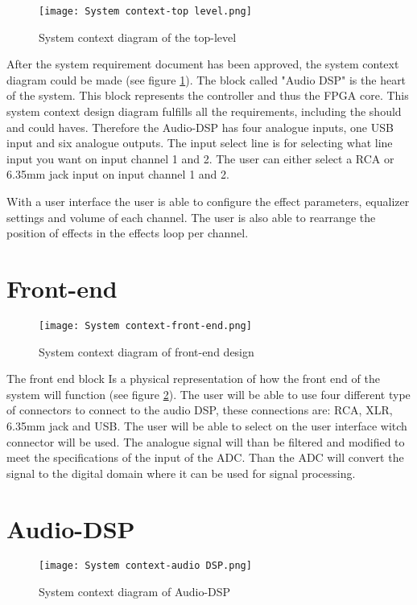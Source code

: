 \begin{figure}[ht]
    \texttt{[image: System context-top level.png]}
    \caption{System context diagram of the top-level}
    \label{fig:sys-context-top}
\end{figure}

After the system requirement document has been approved, the system context diagram could be made (see figure \ref{fig:sys-context-top}). The block called "Audio DSP" is the heart of the system. This block represents the controller and thus the FPGA core. This system context design diagram fulfills all the requirements, including the should and could haves. Therefore the Audio-DSP has four analogue inputs, one USB input and six analogue outputs. The input select line is for selecting what line input you want on input channel 1 and 2. The user can either select a RCA or 6.35mm jack input on input channel 1 and 2.

With a user interface the user is able to configure the effect parameters, equalizer settings and volume of each channel. The user is also able to rearrange the position of effects in the effects loop per channel.

\section{Front-end}
\begin{figure}[ht]
    \texttt{[image: System context-front-end.png]}
    \caption{System context diagram of front-end design}
    \label{fig:system-context-front-end}
\end{figure}

The front end block Is a physical representation of how the front end of the system will function (see figure \ref{fig:system-context-front-end}). The user will be able to use four different type of connectors to connect to the audio DSP, these connections are: RCA, XLR, 6.35mm jack and USB. The user will be able to select on the user interface witch connector will be used. The analogue signal will than be filtered and modified to meet the specifications of the input of the ADC. Than the ADC will convert the signal to the digital domain where it can be used for signal processing. 

\section{Audio-DSP}
\begin{figure}[ht]
    \texttt{[image: System context-audio DSP.png]}
    \caption{System context diagram of Audio-DSP}
    \label{fig:sys-context-audio-dsp}
\end{figure}

